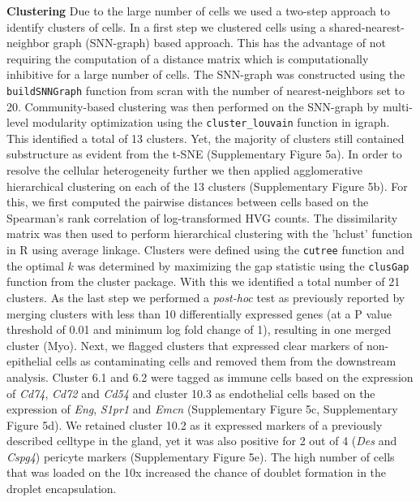 \documentclass[titlepage, 12pt, oneside]{amsart}
\begin{document}
\textbf{Clustering}
Due to the large number of cells we used a two-step approach to identify clusters of cells.
In a first step we clustered cells using a shared-nearest-neighbor graph (SNN-graph) based approach.
This has the advantage of not requiring the computation of a distance matrix which is computationally inhibitive for a large number of cells.
The SNN-graph was constructed using the \texttt{buildSNNGraph} function from scran with the number of nearest-neighbors set to 20.
Community-based clustering was then performed on the SNN-graph by multi-level modularity optimization using the \texttt{cluster\_louvain} function in igraph\autocite{Csardi2006}.
This identified a total of 13 clusters.
Yet, the majority of clusters still contained substructure as evident from the t-SNE (Supplementary Figure 5a).
In order to resolve the cellular heterogeneity further we then applied agglomerative hierarchical clustering on each of the 13 clusters (Supplementary Figure 5b).
For this, we first computed the pairwise distances between cells based on the Spearman's rank correlation of log-transformed HVG counts.
The dissimilarity matrix was then used to perform hierarchical clustering with the 'hclust' function in R using average linkage.
Clusters were defined using the \texttt{cutree} function and the optimal $k$ was determined by maximizing the gap statistic using the \texttt{clusGap} function from the cluster package\autocite{Maechler2017}.
With this we identified a total number of 21 clusters.
As the last step we performed a \textit{post-hoc} test as previously reported\autocite{Macosko2015} by merging clusters with less than 10 differentially expressed genes (at a P value threshold of 0.01 and minimum log fold change of 1), resulting in one merged cluster (Myo). 
Next, we flagged clusters that expressed clear markers of non-epithelial cells as contaminating cells and removed them from the downstream analysis.
Cluster 6.1 and 6.2 were tagged as immune cells based on the expression of \textit{Cd74}, \textit{Cd72} and \textit{Cd54}\autocite{Scheele2017} and cluster 10.3 as endothelial cells based on the expression of \textit{Eng}, \textit{S1pr1} and \textit{Emcn} (Supplementary Figure 5c, Supplementary Figure 5d).
We retained cluster 10.2 as it expressed markers of a previously described celltype in the gland\autocite{Wang2015}, yet it was also positive for 2 out of 4 (\textit{Des} and \textit{Cspg4}) pericyte markers\autocite{Armulik2011} (Supplementary Figure 5e).
The high number of cells that was loaded on the 10x increased the chance of doublet formation in the droplet encapsulation\autocite{Zheng2017}.
\end{document}
